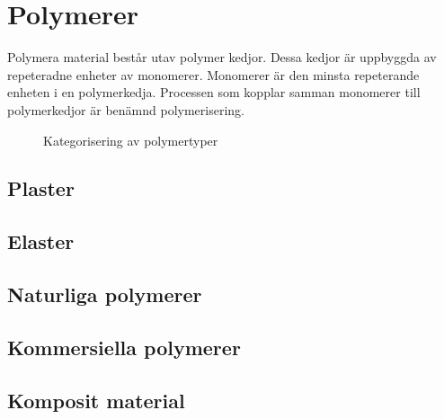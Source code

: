 \section{Polymerer}
Polymera material består utav polymer kedjor. Dessa kedjor är uppbyggda av repeteradne enheter av monomerer. Monomerer är den minsta repeterande enheten i en polymerkedja. Processen som kopplar samman monomerer till polymerkedjor är benämnd polymerisering.

\begin{figure}[ht]
    \centering
    
    \caption{Kategorisering av polymertyper \cite[s.5]{polym}}
    \label{fig:polymer_typer}
\end{figure}

\subsection{Plaster}
\subsection{Elaster}

\subsection{Naturliga polymerer}
\subsection{Kommersiella polymerer}
\subsection{Komposit material}